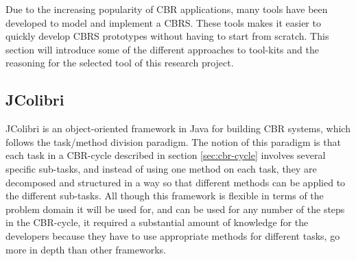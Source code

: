 Due to the increasing popularity of CBR applications\cite{kolodner2014case}, many tools have been developed to model and implement a CBRS. These tools makes it easier to quickly develop CBRS prototypes without having to start from scratch. This section will introduce some of the different approaches to tool-kits and the reasoning for the selected tool of this research project. 

\subsection{JColibri}
JColibri is an object-oriented framework in Java for building CBR systems, which follows the task/method division paradigm.\cite{bello2004jcolibri} The notion of this paradigm is that each task in a CBR-cycle described in section \ref{sec:cbr-cycle} involves several specific sub-tasks, and instead of using one method on each task, they are decomposed and structured in a way so that different methods can be applied to the different sub-tasks. All though this framework is flexible in terms of the problem domain it will be used for, and can be used for any number of the steps in the CBR-cycle, it required a substantial amount of knowledge for the developers because they have to use appropriate methods for different tasks, go more in depth than other frameworks.

